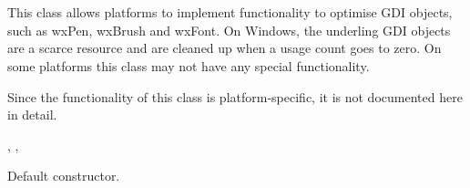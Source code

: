 \section{}\label{wxgdiobject}

This class allows platforms to implement functionality to optimise GDI objects, such
as wxPen, wxBrush and wxFont. On Windows, the underling GDI objects are a scarce resource
and are cleaned up when a usage count goes to zero. On some platforms this
class may not have any special functionality.

Since the functionality of this class is platform-specific, it is not documented here in detail.




, , 


\label{wxgdiobjectconstr}


Default constructor.


